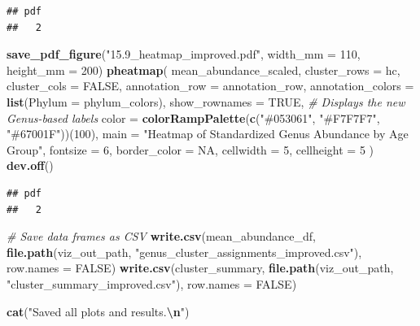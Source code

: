 \documentclass[
]{article}
\newenvironment{Shaded}{\begin{snugshade}}{\end{snugshade}}
\newcommand{\AttributeTok}[1]{\textcolor[rgb]{0.13,0.29,0.53}{#1}}
\newcommand{\CommentTok}[1]{\textcolor[rgb]{0.56,0.35,0.01}{\textit{#1}}}
\newcommand{\ConstantTok}[1]{\textcolor[rgb]{0.56,0.35,0.01}{#1}}
\newcommand{\DecValTok}[1]{\textcolor[rgb]{0.00,0.00,0.81}{#1}}
\newcommand{\FunctionTok}[1]{\textcolor[rgb]{0.13,0.29,0.53}{\textbf{#1}}}
\newcommand{\NormalTok}[1]{#1}
\newcommand{\SpecialCharTok}[1]{\textcolor[rgb]{0.81,0.36,0.00}{\textbf{#1}}}
\newcommand{\StringTok}[1]{\textcolor[rgb]{0.31,0.60,0.02}{#1}}
\begin{document}
\begin{verbatim}
## pdf 
##   2
\end{verbatim}

\begin{Shaded}
\begin{Highlighting}[]
\FunctionTok{save\_pdf\_figure}\NormalTok{(}\StringTok{"15.9\_heatmap\_improved.pdf"}\NormalTok{, }\AttributeTok{width\_mm =} \DecValTok{110}\NormalTok{, }\AttributeTok{height\_mm =} \DecValTok{200}\NormalTok{)}
\FunctionTok{pheatmap}\NormalTok{(}
\NormalTok{  mean\_abundance\_scaled,}
  \AttributeTok{cluster\_rows =}\NormalTok{ hc,}
  \AttributeTok{cluster\_cols =} \ConstantTok{FALSE}\NormalTok{,}
  \AttributeTok{annotation\_row =}\NormalTok{ annotation\_row,}
  \AttributeTok{annotation\_colors =} \FunctionTok{list}\NormalTok{(}\AttributeTok{Phylum =}\NormalTok{ phylum\_colors),}
  \AttributeTok{show\_rownames =} \ConstantTok{TRUE}\NormalTok{,  }\CommentTok{\# Displays the new Genus{-}based labels}
  \AttributeTok{color =} \FunctionTok{colorRampPalette}\NormalTok{(}\FunctionTok{c}\NormalTok{(}\StringTok{"\#053061"}\NormalTok{, }\StringTok{"\#F7F7F7"}\NormalTok{, }\StringTok{"\#67001F"}\NormalTok{))(}\DecValTok{100}\NormalTok{),}
  \AttributeTok{main =} \StringTok{"Heatmap of Standardized Genus Abundance by Age Group"}\NormalTok{,}
  \AttributeTok{fontsize =} \DecValTok{6}\NormalTok{,}
  \AttributeTok{border\_color =} \ConstantTok{NA}\NormalTok{,}
  \AttributeTok{cellwidth =} \DecValTok{5}\NormalTok{,}
  \AttributeTok{cellheight =} \DecValTok{5}
\NormalTok{)}
\FunctionTok{dev.off}\NormalTok{()}
\end{Highlighting}
\end{Shaded}

\begin{verbatim}
## pdf 
##   2
\end{verbatim}

\begin{Shaded}
\begin{Highlighting}[]
\CommentTok{\# Save data frames as CSV}
\FunctionTok{write.csv}\NormalTok{(mean\_abundance\_df, }\FunctionTok{file.path}\NormalTok{(viz\_out\_path, }\StringTok{"genus\_cluster\_assignments\_improved.csv"}\NormalTok{), }\AttributeTok{row.names =} \ConstantTok{FALSE}\NormalTok{)}
\FunctionTok{write.csv}\NormalTok{(cluster\_summary, }\FunctionTok{file.path}\NormalTok{(viz\_out\_path, }\StringTok{"cluster\_summary\_improved.csv"}\NormalTok{), }\AttributeTok{row.names =} \ConstantTok{FALSE}\NormalTok{)}

\FunctionTok{cat}\NormalTok{(}\StringTok{"Saved all plots and results.}\SpecialCharTok{\textbackslash{}n}\StringTok{"}\NormalTok{)}
\end{Highlighting}
\end{Shaded}
\end{document}
